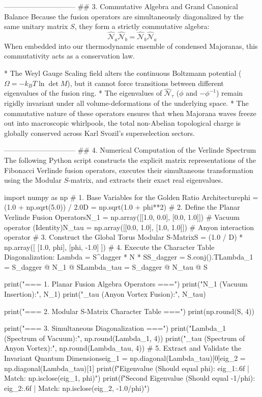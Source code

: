 ------------------------------
## 3. Commutative Algebra and Grand Canonical Balance
Because the fusion operators are simultaneously diagonalized by the same unitary matrix $S$, they form a strictly commutative algebra:
$$\hat{\mathcal{N}}_a \hat{\mathcal{N}}_b = \hat{\mathcal{N}}_b \hat{\mathcal{N}}_a$$ 
When embedded into our thermodynamic ensemble of condensed Majoranas, this commutativity acts as a conservation law.

* The Weyl Gauge Scaling field alters the continuous Boltzmann potential ($\Omega = -k_B T \ln \det M$), but it cannot force transitions between different eigenvalues of the fusion ring.
* The eigenvalues of $\hat{\mathcal{N}}_\tau$ ($\phi$ and $-\phi^{-1}$) remain rigidly invariant under all volume-deformations of the underlying space.
* The commutative nature of these operators ensures that when Majorana waves freeze out into macroscopic whirlpools, the total non-Abelian topological charge is globally conserved across Karl Svozil's superselection sectors.

------------------------------
## 4. Numerical Computation of the Verlinde Spectrum
The following Python script constructs the explicit matrix representations of the Fibonacci Verlinde fusion operators, executes their simultaneous transformation using the Modular $S$-matrix, and extracts their exact real eigenvalues.

import numpy as np
# 1. Base Variables for the Golden Ratio Architecturephi = (1.0 + np.sqrt(5.0)) / 2.0D = np.sqrt(1.0 + phi**2)
# 2. Define the Planar Verlinde Fusion OperatorsN_1 = np.array([[1.0, 0.0], [0.0, 1.0]])    # Vacuum operator (Identity)N_tau = np.array([[0.0, 1.0], [1.0, 1.0]])  # Anyon interaction operator
# 3. Construct the Global Torus Modular S-MatrixS = (1.0 / D) * np.array([
    [1.0, phi],
    [phi, -1.0]
])
# 4. Execute the Character Table Diagonalization: Lambda = S^dagger * N * SS_dagger = S.conj().TLambda_1 = S_dagger @ N_1 @ SLambda_tau = S_dagger @ N_tau @ S

print("=== 1. Planar Fusion Algebra Operators ===")
print("N_1 (Vacuum Insertion):\n", N_1)
print("\nN_tau (Anyon Vortex Fusion):\n", N_tau)

print("\n=== 2. Modular S-Matrix Character Table ===")
print(np.round(S, 4))

print("\n=== 3. Simultaneous Diagonalization ===")
print("Lambda_1 (Spectrum of Vacuum):\n", np.round(Lambda_1, 4))
print("\nLambda_tau (Spectrum of Anyon Vortex):\n", np.round(Lambda_tau, 4))
# 5. Extract and Validate the Invariant Quantum Dimensionseig_1 = np.diagonal(Lambda_tau)[0]eig_2 = np.diagonal(Lambda_tau)[1]
print(f"\nFirst Eigenvalue  (Should equal phi):       {eig_1:.6f} | Match: {np.isclose(eig_1, phi)}")
print(f"Second Eigenvalue (Should equal -1/phi):   {eig_2:.6f} | Match: {np.isclose(eig_2, -1.0/phi)}")

